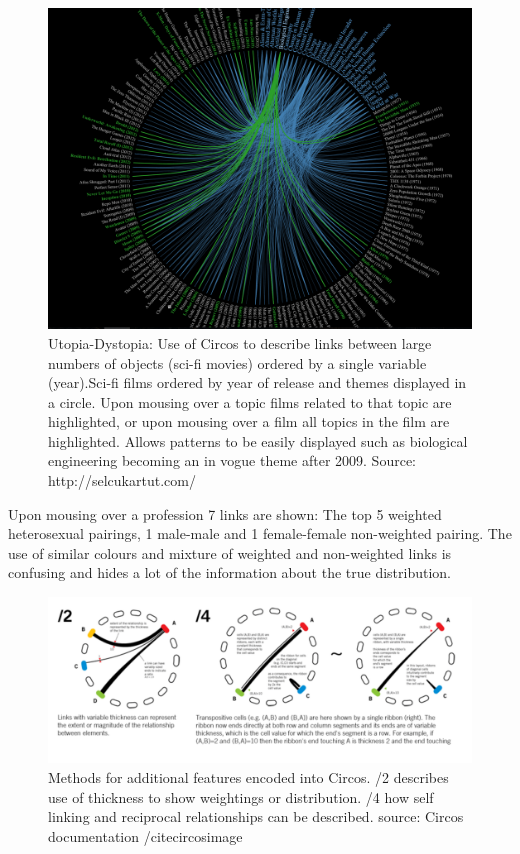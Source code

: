 \documentclass[a4paper,10pt, twocolumn]{article}
\begin{document}
\begin{figure}[htbp]
	\includegraphics[width=\linewidth]{scifi.png}
	\centering
	\caption{Utopia-Dystopia: Use of Circos to describe links between large numbers of objects (sci-fi movies) ordered by a single variable (year).Sci-fi films ordered by year of release and themes displayed in a circle. Upon mousing over a topic films related to that topic are highlighted, or upon mousing over a film all topics in the film are highlighted. Allows patterns to be easily displayed such as biological engineering becoming an in vogue theme after 2009. Source: http://selcukartut.com/ \cite{scifi}}
	\label{fig:scifi}
\end{figure} 

Upon mousing over a profession 7 links are shown: The top 5 weighted heterosexual pairings, 1 male-male and 1 female-female non-weighted pairing. The use of similar colours and mixture of weighted and non-weighted links is confusing and hides a lot of the information about the true distribution. 


\begin{figure}[htbp]
\centering
\includegraphics[width=\linewidth]{circos.png}
\caption{Methods for additional features encoded into Circos. /2 describes use of thickness to show weightings or distribution. /4 how self linking and reciprocal relationships can be described. 
source: Circos documentation /cite{circosimage}}
\label{fig:circos}
\end{figure}
\end{document}
